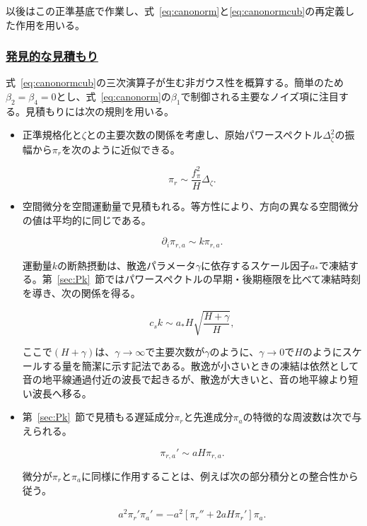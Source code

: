 \documentclass[a4paper,11pt]{ltjsarticle}
\numberwithin{equation}{section}
\newcommand{\subsubsectionlink}[1]{\subsubsection[#1]{\hyperlink{toc}{#1}}}
\def\pia{\pi_{a}}
\def\pir{\pi_{r}}
\newcommand{\Eq}[1]{Eq.~(\ref{#1})}
\newcommand{\Eqs}[1]{Eqs.~(\ref{#1})}
\newcommand{\Sec}[1]{Sec.~\ref{#1}}
\renewcommand{\Eq}[1]{式~\eqref{#1}}
\renewcommand{\Eqs}[1]{式~\eqref{#1}}
\renewcommand{\Sec}[1]{第~\ref{#1}~節}
\begin{document}
以後はこの正準基底で作業し、\Eqs{eq:canonorm}と\eqref{eq:canonormcub}の再定義した作用を用いる。

\subsubsectionlink{発見的な見積もり}

\Eq{eq:canonormcub}の三次演算子が生む非ガウス性を概算する。簡単のため$\beta_2=\beta_4=0$とし、\Eq{eq:canonorm}の$\beta_1$で制御される主要なノイズ項に注目する。見積もりには次の規則を用いる。
\begin{itemize}
\item 正準規格化と$\zeta$との主要次数の関係を考慮し、原始パワースペクトル$\Delta_\zeta^2$の振幅から$\pir$を次のように近似できる。

\begin{equation}\label{eq:rule1}
        \pir\sim\frac{f_{\pi}^{2}}{H}\Delta_{\zeta}.
    \end{equation}

\item 空間微分を空間運動量で見積もれる。等方性により、方向の異なる空間微分の値は平均的に同じである。

\begin{equation}\label{eq:rule2}
        \partial_{i}\pi_{r,a}\sim k\pi_{r,a}.
    \end{equation}

運動量$k$の断熱摂動は、散逸パラメータ$\gamma$に依存するスケール因子$a_*$で凍結する\cite{LopezNacir:2011kk}。\Sec{sec:Pk}ではパワースペクトルの早期・後期極限を比べて凍結時刻を導き、次の関係を得る。

\begin{equation}\label{eq:rule3}
        c_s k\sim a_* H \sqrt{\frac{H+\gamma}{H}},
    \end{equation}

ここで$(H+\gamma)$は、$\gamma\to\infty$で主要次数が$\gamma$のように、$\gamma\to0$で$H$のようにスケールする量を簡潔に示す記法である。散逸が小さいときの凍結は依然として音の地平線通過付近の波長で起きるが、散逸が大きいと、音の地平線より短い波長へ移る。
\item \Sec{sec:Pk}で見積もる遅延成分$\pir$と先進成分$\pia$の特徴的な周波数は次で与えられる。

\begin{equation}\label{eq:rule4}
        \pi_{r,a}'\sim a H \pi_{r,a}.
    \end{equation}

微分が$\pir$と$\pia$に同様に作用することは、例えば次の部分積分との整合性から従う。

\begin{align}
        a^2 \pir'\pia' = - a^2 \left[\pir'' + 2 a H \pir' \right]  \pia.
    \end{align}


\end{itemize}
\end{document}
